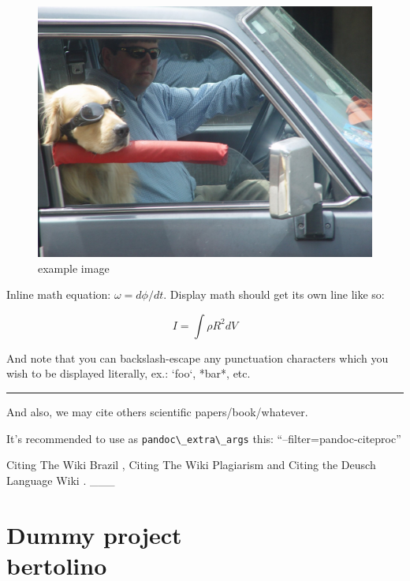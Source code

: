 \documentclass[
  12pt,
  a4paper,
  oneside,tablecaptionabove
]{scrbook}
\newcommand{\passthrough}[1]{#1}
\def \logbuchprojectmark {}
\begin{document}
\begin{figure}
\centering
\includegraphics{example-image.jpg}
\caption{example image}
\end{figure}

Inline math equation: \(\omega = d\phi / dt\). Display math should get
its own line like so:

\[I = \int \rho R^{2} dV\]

And note that you can backslash-escape any punctuation characters which
you wish to be displayed literally, ex.: `foo`, *bar*, etc.

\begin{center}\rule{0.5\linewidth}{\linethickness}\end{center}

And also, we may cite others scientific papers/book/whatever.

It's recommended to use as \passthrough{\lstinline!pandoc\_extra\_args!}
this: ``--filter=pandoc-citeproc''

Citing The Wiki Brazil \textcite{wiki:Brazil}, Citing The Wiki
Plagiarism \autocite{wiki:Plagiarism} and Citing the Deusch Language
Wiki \autocite*{wiki:Deutsch}. \_\_\_


\part*{Dummy project \\ \bigskip\bigskip\bigskip\bigskip\bigskip\normalfont\large{bertolino}}

\def \logbuchprojectmark {Dummy project}
\end{document}
